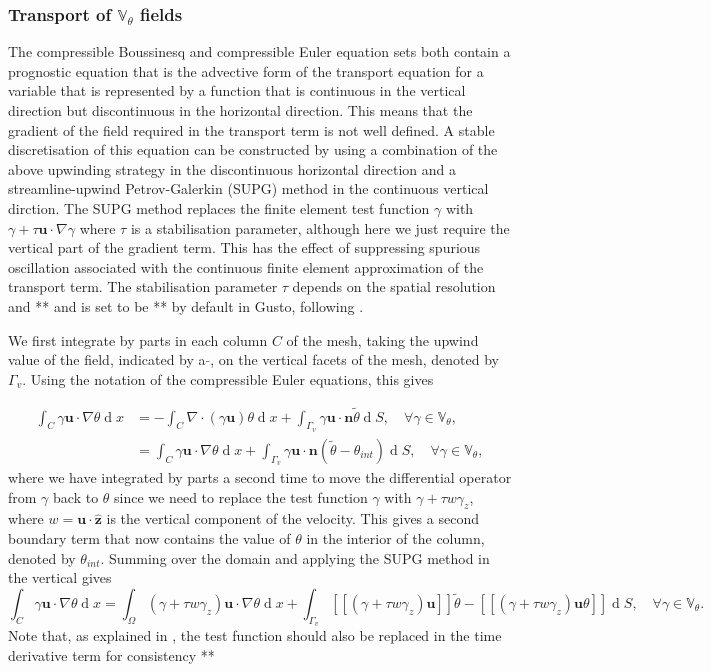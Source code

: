 \documentclass[journal abbreviation, manuscript]{copernicus}
\def\MM#1{\boldsymbol{#1}}
\DeclareMathOperator{\diff}{d}
\newcommand{\jump}[1]{[\![#1]\!]}
\begin{document}
\subsubsection{Transport of $\mathbb{V}_\theta$ fields}
The compressible Boussinesq and compressible Euler equation sets both
contain a prognostic equation that is the advective form of the
transport equation for a variable that is represented by a function
that is continuous in the vertical direction but discontinuous in the
horizontal direction. This means that the gradient of the field
required in the transport term is not well defined. A stable
discretisation of this equation can be constructed by using a
combination of the above upwinding strategy in the discontinuous
horizontal direction and a streamline-upwind Petrov-Galerkin (SUPG)
method in the continuous vertical dirction. The SUPG method replaces
the finite element test function $\gamma$ with $\gamma + \tau
\MM{u}\cdot\nabla\gamma$ where $\tau$ is a stabilisation parameter,
although here we just require the vertical part of the gradient term. This
has the effect of suppressing spurious oscillation associated with the
continuous finite element approximation of the transport term. The
stabilisation parameter $\tau$ depends on the spatial resolution and
** and is set to be ** by default in Gusto, following \citet{}.

We first integrate by parts in each column $C$ of the mesh, taking the
upwind value of the field, indicated by a $\tilde{}$, on the vertical
facets of the mesh, denoted by $\Gamma_v$. Using the notation of the
compressible Euler equations, this gives

\begin{align}
  \int_C \gamma\MM{u}\cdot\nabla\theta\diff x &= -\int_C \nabla\cdot(\gamma\MM{u})\theta \diff x + \int_{\Gamma_v}\gamma \MM{u}\cdot\MM{n}\tilde{\theta}\diff S, \quad \forall \gamma \in \mathbb{V}_\theta, \\
  &= \int_C \gamma\MM{u}\cdot\nabla\theta \diff x + \int_{\Gamma_v}\gamma \MM{u}\cdot\MM{n}(\tilde{\theta}-\theta_{int})\diff S, \quad \forall \gamma \in \mathbb{V}_\theta,
\end{align}
where we have integrated by parts a second time to move the
differential operator from $\gamma$ back to $\theta$ since we need to
replace the test function $\gamma$ with $\gamma+\tau w\gamma_z$, where
$w=\MM{u}\cdot\hat{\MM{z}}$ is the vertical component of the
velocity. This gives a second boundary term that now contains the
value of $\theta$ in the interior of the column, denoted by
$\theta_{int}$. Summing over the domain and applying the SUPG method
in the vertical gives
\begin{equation}
  \int_C \gamma\MM{u}\cdot\nabla\theta\diff x =\int_\Omega(\gamma+\tau w\gamma_z)\MM{u}\cdot\nabla\theta \diff x + \int_{\Gamma_v}\jump{(\gamma+\tau w\gamma_z) \MM{u}}\tilde{\theta}-\jump{(\gamma+\tau w\gamma_z) \MM{u}\theta}\diff S, \quad \forall \gamma \in \mathbb{V}_\theta.
\end{equation}
Note that, as explained in \citet{Colin}, the test function should
also be replaced in the time derivative term for consistency **
  
\end{document}
